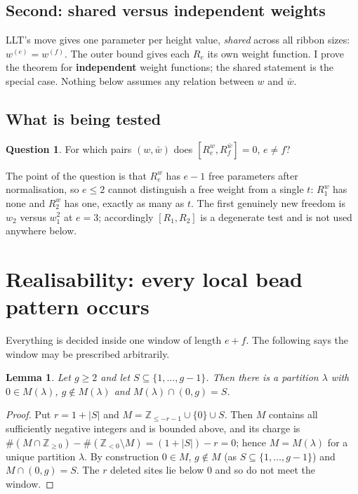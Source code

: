 \documentclass[11pt]{article}
\newtheorem{lemma}[theorem]{Lemma}
\theoremstyle{definition}
\newtheorem{question}[theorem]{Question}
\newcommand{\Z}{\mathbb{Z}}
\begin{document}
\subsection*{Second: shared versus independent weights}

LLT's move gives one parameter per height value, \emph{shared} across all ribbon sizes:
$w^{(e)}=w^{(f)}$.  The outer bound gives each $R_e$ its own weight function.  I prove
the theorem for \textbf{independent} weight functions; the shared statement is the
special case.  Nothing below assumes any relation between $w$ and $\bar w$.

\subsection*{What is being tested}

\begin{question}\label{q:main}
For which pairs $(w,\bar w)$ does $[R_e^{w},R_f^{\bar w}]=0$, $e\ne f$?
\end{question}

The point of the question is that $R_e^w$ has $e-1$ free parameters after normalisation,
so $e\le2$ cannot distinguish a free weight from a single $t$: $R_1^w$ has none and
$R_2^w$ has one, exactly as many as $t$.  The first genuinely new freedom is
$w_2$ versus $w_1^2$ at $e=3$; accordingly $[R_1,R_2]$ is a degenerate test and is not
used anywhere below.

\section{Realisability: every local bead pattern occurs}

Everything is decided inside one window of length $e+f$.  The following says the window
may be prescribed arbitrarily.

\begin{lemma}\label{lem:realise}
Let $g\ge2$ and let $S\subseteq\{1,\dots,g-1\}$.  Then there is a partition $\lambda$
with $0\in M(\lambda)$, $g\notin M(\lambda)$ and $M(\lambda)\cap(0,g)=S$.
\end{lemma}

\begin{proof}
Put $r=1+|S|$ and $M=\Z_{\le -r-1}\cup\{0\}\cup S$.  Then $M$ contains all sufficiently
negative integers and is bounded above, and its charge is
$\#(M\cap\Z_{\ge0})-\#(\Z_{<0}\setminus M)=(1+|S|)-r=0$; hence $M=M(\lambda)$ for a
unique partition $\lambda$.  By construction $0\in M$, $g\notin M$ (as
$S\subseteq\{1,\dots,g-1\}$) and $M\cap(0,g)=S$.  The $r$ deleted sites lie below $0$ and
so do not meet the window.
\end{proof}
\end{document}

